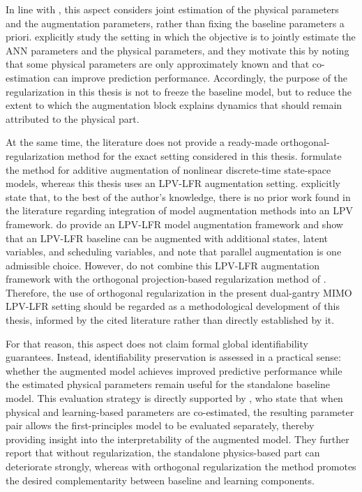 In line with \citet{gyorok2025orthogonal}, this aspect considers joint estimation of the physical parameters and the augmentation parameters, rather than fixing the baseline parameters a priori. \citet{gyorok2025orthogonal} explicitly study the setting in which the objective is to jointly estimate the ANN parameters and the physical parameters, and they motivate this by noting that some physical parameters are only approximately known and that co-estimation can improve prediction performance. Accordingly, the purpose of the regularization in this thesis is not to freeze the baseline model, but to reduce the extent to which the augmentation block explains dynamics that should remain attributed to the physical part.

At the same time, the literature does not provide a ready-made orthogonal-regularization method for the exact setting considered in this thesis. \citet{gyorok2025orthogonal} formulate the method for additive augmentation of nonlinear discrete-time state-space models, whereas this thesis uses an LPV-LFR augmentation setting. \citet{drenth2025thesis} explicitly state that, to the best of the author's knowledge, there is no prior work found in the literature regarding integration of model augmentation methods into an LPV framework. \citet{drenth2025thesis} do provide an LPV-LFR model augmentation framework and show that an LPV-LFR baseline can be augmented with additional states, latent variables, and scheduling variables, and note that parallel augmentation is one admissible choice. However, \citet{drenth2025thesis} do not combine this LPV-LFR augmentation framework with the orthogonal projection-based regularization method of \citet{gyorok2025orthogonal}. Therefore, the use of orthogonal regularization in the present dual-gantry MIMO LPV-LFR setting should be regarded as a methodological development of this thesis, informed by the cited literature rather than directly established by it.

For that reason, this aspect does not claim formal global identifiability guarantees. Instead, identifiability preservation is assessed in a practical sense: whether the augmented model achieves improved predictive performance while the estimated physical parameters remain useful for the standalone baseline model. This evaluation strategy is directly supported by \citet{gyorok2025orthogonal}, who state that when physical and learning-based parameters are co-estimated, the resulting parameter pair allows the first-principles model to be evaluated separately, thereby providing insight into the interpretability of the augmented model. They further report that without regularization, the standalone physics-based part can deteriorate strongly, whereas with orthogonal regularization the method promotes the desired complementarity between baseline and learning components.

